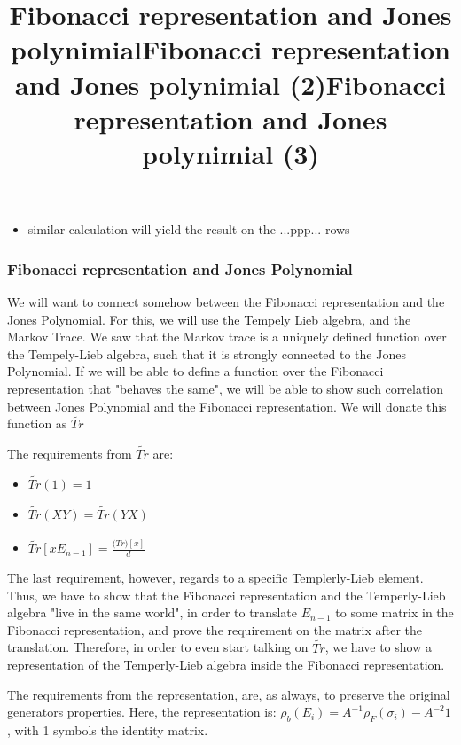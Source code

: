 \documentclass{article}
\begin{document}
{\begin{itemize}
\( = \tau^{2.5} + A^{-4}\tau^{2.5} - A^{4}\tau^{3.5} - \tau^{3.5} + \tau^{3.5} - A^{-4}\tau^{2.5} + A^{4}\tau^{3.5} - \tau^{2.5}\)

\( = 0\)
\item similar calculation will yield the result on the ...ppp... rows   
\end{itemize}

\subsubsection{Fibonacci representation and Jones Polynomial}
\title{Fibonacci representation and Jones polynimial}
We will want to connect somehow between the Fibonacci representation and the Jones Polynomial.
For this, we will use the Tempely Lieb algebra, and the Markov Trace. We saw that the Markov trace
is a uniquely defined function over the Tempely-Lieb algebra, such that it is strongly connected to the Jones Polynomial. If we will be able to define a function over the Fibonacci representation that "behaves the same", we will be able to show such correlation between Jones Polynomial and the Fibonacci representation. We will donate this function as \(\tilde{Tr}\)


\title{Fibonacci representation and Jones polynimial (2)}
The requirements from  \(\tilde{Tr}\) are:
\begin{itemize}
\item \(\tilde{Tr}(1) = 1\)
\item \(\tilde{Tr}(XY) = \tilde{Tr}(YX)\)
\item  \( \tilde{Tr}[xE_{n-1}]=\frac{\tilde(Tr)[x]}{d}\)    
\end{itemize}
The last requirement, however, regards to a specific Templerly-Lieb element. Thus, we have to show that the Fibonacci representation and the Temperly-Lieb algebra "live in the same world", in order to translate \(E_{n-1}\) to some matrix in the Fibonacci representation, and prove the requirement on the matrix after the translation. Therefore, in order to even start talking on \(\tilde{Tr}\), we have to show a representation of the Temperly-Lieb algebra inside the Fibonacci representation.  


\title{Fibonacci representation and Jones polynimial (3)}
The requirements from the representation, are, as always, to preserve the original generators properties.
Here, the representation is: \(\rho_{b}(E_{i}) = A^{-1}\rho_{F}(\sigma_{i}) - A^{-2}1\) , with 1 symbols the identity matrix.

}
\end{document}
